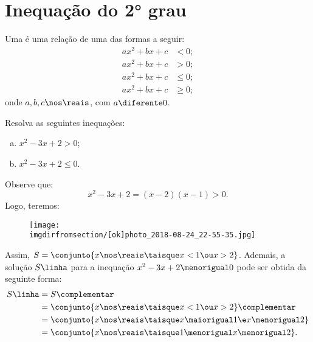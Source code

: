 \section{Inequação do 2° grau}

\begin{definition}
    Uma  é uma relação de uma das formas
    a seguir:
    \begin{align*}
        ax^2 + bx + c &< 0;   \\
        ax^2 + bx + c &> 0;   \\
        ax^2 + bx + c &\le 0; \\
        ax^2 + bx + c &\ge 0;
    \end{align*}
    onde $a, b, c \nos \reais$, com $a \diferente 0$.
\end{definition}

\begin{example}
    Resolva as seguintes inequações:
    \begin{enumerate}[a)]
        \item $x^2 -3x +2 > 0$;
        \item $x^2 -3x +2 \le 0$.
    \end{enumerate}
\end{example}

\begin{solution}
    Observe que: 
    \[
        x^2 - 3x + 2 = (x-2)(x-1) > 0.
    \]
    Logo, teremos:
    \begin{figure}[H]
        \centering
        \texttt{[image: \\imgdirfromsection/[ok]photo\_2018-08-24\_22-55-35.jpg]}
        \caption{}
    \end{figure}

    Assim, $S = \conjunto{ x \nos \reais \taisque x < 1 \ou x > 2 }$. Ademais, a solução $S\linha$ para a inequação $x^2 - 3x + 2 \menorigual 0$ pode ser obtida da seguinte forma:
    \begin{align*}
        S\linha &= S\complementar \\ 
                &= \conjunto{ x \nos \reais \taisque x < 1 \ou x > 2 }\complementar \\ 
                &= \conjunto{ x \nos \reais \taisque x \maiorigual 1 \e x \menorigual 2 } \\ 
                &= \conjunto{ x \nos \reais \taisque 1 \menorigual x \menorigual 2 }.
    \end{align*}
\end{solution}

